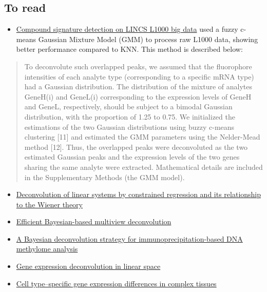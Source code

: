 \documentclass[]{article}
\providecommand{\tightlist}{%
  \setlength{\itemsep}{0pt}\setlength{\parskip}{0pt}}
\begin{document}
\hypertarget{to-read}{%
\subsection{To read}\label{to-read}}

\begin{itemize}
\tightlist
\item
  \href{https://pubs.rsc.org/en/content/getauthorversionpdf/c4mb00677a}{Compound
  signature detection on LINCS L1000 big data} used a fuzzy c-means
  Gaussian Mixture Model (GMM) to process raw L1000 data, showing better
  performance compared to KNN. This method is described below:
\end{itemize}

\begin{quote}
To deconvolute such overlapped peaks, we assumed that the fluorophore
intensities of each analyte type (corresponding to a specific mRNA type)
had a Gaussian distribution. The distribution of the mixture of analytes
GeneH(i) and GeneL(i) corresponding to the expression levels of GeneH
and GeneL, respectively, should be subject to a bimodal Gaussian
distribution, with the proportion of 1.25 to 0.75. We initialized the
estimations of the two Gaussian distributions using buzzy c-means
clustering {[}11{]} and estimated the GMM parameters using the
Nelder-Mead method {[}12{]}. Thus, the overlapped peaks were
deconvoluted as the two estimated Gaussian peaks and the expression
levels of the two genes sharing the same analyte were extracted.
Mathematical details are included in the Supplementary Methods (the GMM
model).
\end{quote}

\begin{itemize}
\item
  \href{https://ieeexplore.ieee.org/abstract/document/4044778}{Deconvolution
  of linear systems by constrained regression and its relationship to
  the Wiener theory}
\item
  \href{https://www.nature.com/articles/nmeth.2929}{Efficient
  Bayesian-based multiview deconvolution}
\item
  \href{https://www.nature.com/articles/nbt1414}{A Bayesian
  deconvolution strategy for immunoprecipitation-based DNA methylome
  analysis}
\item
  \href{https://www.nature.com/articles/nmeth.1830}{Gene expression
  deconvolution in linear space}
\item
  \href{https://www.nature.com/articles/nmeth.1439}{Cell type--specific
  gene expression differences in complex tissues}
\end{itemize}
\end{document}
